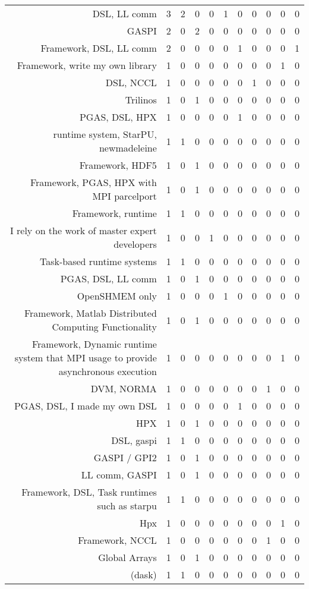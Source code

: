 {\begin{landscape}
\begin{longtable}[htb]{r|c|c|c|c|c|c|c|c|c|c}
{DSL, LL comm} & 3 & 2 & 0 & 0 & 1 & 0 & 0 & 0 & 0 & 0 \\%
{GASPI} & 2 & 0 & 2 & 0 & 0 & 0 & 0 & 0 & 0 & 0 \\%
{Framework, DSL, LL comm} & 2 & 0 & 0 & 0 & 0 & 1 & 0 & 0 & 0 & 1 \\%
{Framework, write my own library} & 1 & 0 & 0 & 0 & 0 & 0 & 0 & 0 & 1 & 0 \\%
{DSL, NCCL} & 1 & 0 & 0 & 0 & 0 & 0 & 1 & 0 & 0 & 0 \\%
{Trilinos} & 1 & 0 & 1 & 0 & 0 & 0 & 0 & 0 & 0 & 0 \\%
{PGAS, DSL, HPX} & 1 & 0 & 0 & 0 & 0 & 1 & 0 & 0 & 0 & 0 \\%
{runtime system, StarPU, newmadeleine} & 1 & 1 & 0 & 0 & 0 & 0 & 0 & 0 & 0 & 0 \\%
{Framework, HDF5} & 1 & 0 & 1 & 0 & 0 & 0 & 0 & 0 & 0 & 0 \\%
{Framework, PGAS, HPX with MPI parcelport} & 1 & 0 & 1 & 0 & 0 & 0 & 0 & 0 & 0 & 0 \\%
{Framework, runtime} & 1 & 1 & 0 & 0 & 0 & 0 & 0 & 0 & 0 & 0 \\%
{I rely on the work of master expert developers} & 1 & 0 & 0 & 1 & 0 & 0 & 0 & 0 & 0 & 0 \\%
{Task-based runtime systems} & 1 & 1 & 0 & 0 & 0 & 0 & 0 & 0 & 0 & 0 \\%
{PGAS, DSL, LL comm} & 1 & 0 & 1 & 0 & 0 & 0 & 0 & 0 & 0 & 0 \\%
{OpenSHMEM only} & 1 & 0 & 0 & 0 & 1 & 0 & 0 & 0 & 0 & 0 \\%
{Framework, Matlab Distributed Computing Functionality} & 1 & 0 & 1 & 0 & 0 & 0 & 0 & 0 & 0 & 0 \\%
{Framework, Dynamic runtime system that MPI usage to provide asynchronous execution} & 1 & 0 & 0 & 0 & 0 & 0 & 0 & 0 & 1 & 0 \\%
{DVM, NORMA} & 1 & 0 & 0 & 0 & 0 & 0 & 0 & 1 & 0 & 0 \\%
{PGAS, DSL, I made my own DSL} & 1 & 0 & 0 & 0 & 0 & 1 & 0 & 0 & 0 & 0 \\%
{HPX} & 1 & 0 & 1 & 0 & 0 & 0 & 0 & 0 & 0 & 0 \\%
{DSL, gaspi} & 1 & 1 & 0 & 0 & 0 & 0 & 0 & 0 & 0 & 0 \\%
{GASPI / GPI2} & 1 & 0 & 1 & 0 & 0 & 0 & 0 & 0 & 0 & 0 \\%
{LL comm, GASPI} & 1 & 0 & 1 & 0 & 0 & 0 & 0 & 0 & 0 & 0 \\%
{Framework, DSL, Task runtimes such as starpu} & 1 & 1 & 0 & 0 & 0 & 0 & 0 & 0 & 0 & 0 \\%
{Hpx} & 1 & 0 & 0 & 0 & 0 & 0 & 0 & 0 & 1 & 0 \\%
{Framework, NCCL} & 1 & 0 & 0 & 0 & 0 & 0 & 0 & 1 & 0 & 0 \\%
{Global Arrays} & 1 & 0 & 1 & 0 & 0 & 0 & 0 & 0 & 0 & 0 \\%
{(dask)} & 1 & 1 & 0 & 0 & 0 & 0 & 0 & 0 & 0 & 0 \\%
\hline%
\end{longtable}%
\end{landscape}}%
\clearpage%
